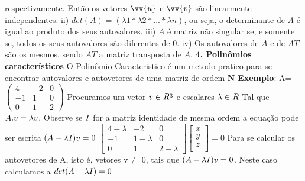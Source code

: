 \documentclass[11pt,a4paper]{article}
\newcommand\tab[1][1.835cm]{\hspace*{#1}}
\begin{document}
\begin{flushleft}
respectivamente. Então os vetores $\vv{u}$ e $\vv{v}$ são linearmente independentes.
\newline \tab ii) $det(A)=(\lambda 1*\lambda 2*...*\lambda n)$, ou seja, o determinante de $A$ é igual ao produto dos seus
autovalores.
\newline \tab iii) $A$ é matriz não singular se, e somente se, todos os seus autovalores são diferentes
de $0$.
\newline \tab iv) Os autovalores de $A$ e de $AT$ são os mesmos, sendo $AT$ a matriz transposta de $A$.
\newline \newline \textbf{4. Polinômios característicos}\linebreak
\tab O Polinômio Caracteristico é um metodo pratico para se encontrar autovalores e autovetores de uma matriz  de ordem \textbf{N}\newline
\textbf{Exemplo}:\newline\newline
A= $
 \begin{pmatrix}
  4 & -2 &  0\\
  -1& 1 & 0 \\
  0& 1 & 2
 \end{pmatrix}
$\vspace*{3mm}\newline
\tab Procuramos um vetor $\mathnormal{v}\in\mathnormal{R^3}$  e escalares $\lambda\in\mathnormal{R}$ Tal que $\mathnormal{A}. \mathnormal {v}= \lambda\mathnormal{v}$. \tab Observe se  $\mathnormal {I}$ for a matriz identidade de mesma ordem a equação pode ser escrita $(\mathnormal {A}-\lambda\mathnormal {I})\mathnormal {v}=0$ \vspace*{3mm}\newline
$\begin{bmatrix*} 4 -\lambda& -2 &  0\\  -1& 1-\lambda & 0 \\  0& 1 & 2-\lambda \end{bmatrix*} \begin{bmatrix}
x\\y\\z\\
\end{bmatrix}=0 $\vspace*{3mm}\newline
\tab Para se calcular os autovetores de  A, isto é, vetores v$\neq$ 0, tais que $(\mathnormal {A}-\lambda\mathnormal {I})\mathnormal {v}=0$. Neste caso calculamos a $det(\mathnormal {A}-\lambda\mathnormal {I})=0$\vspace*{3mm}\newline

\end{flushleft}
\end{document}
